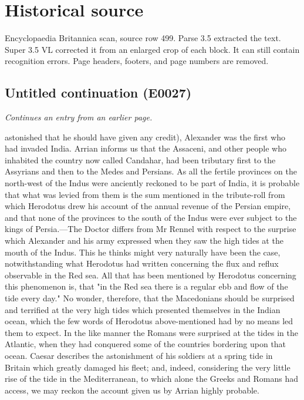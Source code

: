 \documentclass{article}
\begin{document}
\section*{Historical source}
Encyclopaedia Britannica scan, source row 499. Parse 3.5 extracted the text. Super 3.5 VL corrected it from an enlarged crop of each block. It can still contain recognition errors.
Page headers, footers, and page numbers are removed.

\subsection*{Untitled continuation (E0027)}
\textit{Continues an entry from an earlier page.}

astonished that he should have given any credit), Alexander was the first who had invaded India. Arrian informs us that the Assaceni, and other people who inhabited the country now called Candahar, had been tributary first to the Assyrians and then to the Medes and Persians. As all the fertile provinces on the north-west of the Indus were anciently reckoned to be part of India, it is probable that what was levied from them is the sum mentioned in the tribute-roll from which Herodotus drew his account of the annual revenue of the Persian empire, and that none of the provinces to the south of the Indus were ever subject to the kings of Persia.—The Doctor differs from Mr Rennel with respect to the surprise which Alexander and his army expressed when they saw the high tides at the mouth of the Indus. This he thinks might very naturally have been the case, notwithstanding what Herodotus had written concerning the flux and reflux observable in the Red sea. All that has been mentioned by Herodotus concerning this phenomenon is, that "in the Red sea there is a regular ebb and flow of the tide every day." No wonder, therefore, that the Macedonians should be surprised and terrified at the very high tides which presented themselves in the Indian ocean, which the few words of Herodotus above-mentioned had by no means led them to expect. In the like manner the Romans were surprised at the tides in the Atlantic, when they had conquered some of the countries bordering upon that ocean. Caesar describes the astonishment of his soldiers at a spring tide in Britain which greatly damaged his fleet; and, indeed, considering the very little rise of the tide in the Mediterranean, to which alone the Greeks and Romans had access, we may reckon the account given us by Arrian highly probable.
\end{document}
